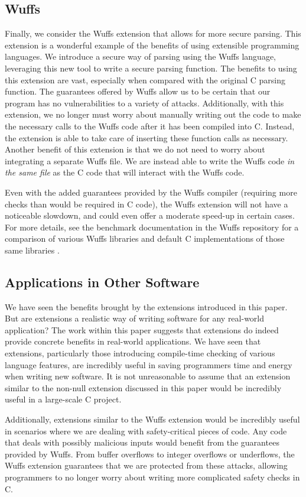 \documentclass[main.tex]{subfiles}
\begin{document}
\subsection{Wuffs}
Finally, we consider the Wuffs extension that allows for more secure parsing. This extension is a wonderful example of
the benefits of using extensible programming languages. We introduce a secure way of parsing using the Wuffs language,
leveraging this new tool to write a secure parsing function. The benefits to using this extension are vast, especially when
compared with the original C parsing function. The guarantees offered by Wuffs allow us to be certain that our program has
no vulnerabilities to a variety of attacks. Additionally, with this extension, we no longer must worry about manually writing out
the code to make the necessary calls to the Wuffs code after it has been compiled into C. Instead, the extension is able to
take care of inserting these function calls as necessary. Another benefit of this extension is that we do not need to worry about
integrating a separate Wuffs file. We are instead able to write the Wuffs code \emph{in the same file} as the C code that will interact with
the Wuffs code.

Even with the added guarantees provided by the Wuffs compiler (requiring more checks than would be required in C code),
the Wuffs extension will not have a noticeable slowdown, and could even offer a moderate speed-up in certain cases. For
more details, see the benchmark documentation in the Wuffs repository for a comparison of various Wuffs libraries and
default C implementations of those same libraries \cite{5}. 

\subsection{Applications in Other Software}
We have seen the benefits brought by the extensions introduced in this paper. But are extensions a realistic way of writing
software for any real-world application? The work within this paper suggests that extensions do indeed provide concrete
benefits in real-world applications. We have seen that extensions, particularly those introducing compile-time checking of
various language features, are incredibly useful in saving programmers time and energy when writing new software. It is not
unreasonable to assume that an extension similar to the non-null extension discussed in this paper would be incredibly useful
in a large-scale C project.

Additionally, extensions similar to the Wuffs extension would be incredibly useful in scenarios where we are dealing with
safety-critical pieces of code. Any code that deals with possibly malicious inputs would benefit from the guarantees provided
by Wuffs. From buffer overflows to integer overflows or underflows, the Wuffs extension guarantees that we are protected from
these attacks, allowing programmers to no longer worry about writing more complicated safety checks in C.
\end{document}
